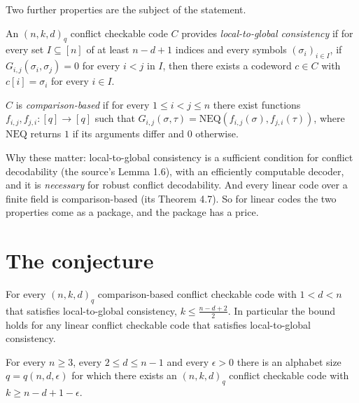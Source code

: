 \documentclass{aicr-conjecture}
\newcommand{\NEQ}{\mathrm{NEQ}}
\begin{document}
Two further properties are the subject of the statement.

\begin{definition}\label{def:l2g}
An $(n,k,d)_{q}$ conflict checkable code $C$ provides \emph{local-to-global
consistency} if for every set $I \subseteq [n]$ of at least $n-d+1$
indices and every symbols $(\sigma_{i})_{i \in I}$, if $G_{i,j}(\sigma_i,
\sigma_j) = 0$ for every $i < j$ in $I$, then there exists a codeword $c
\in C$ with $c[i] = \sigma_{i}$ for every $i \in I$.
\end{definition}

\begin{definition}\label{def:cb}
$C$ is \emph{comparison-based} if for every $1 \le i < j \le n$ there
exist functions $f_{i,j}, f_{j,i} : [q] \to [q]$ such that
$G_{i,j}(\sigma, \tau) = \NEQ(f_{i,j}(\sigma), f_{j,i}(\tau))$, where
$\NEQ$ returns $1$ if its arguments differ and $0$ otherwise.
\end{definition}

Why these matter: local-to-global consistency is a sufficient condition
for conflict decodability (the source's Lemma 1.6), with an efficiently
computable decoder, and it is \emph{necessary} for robust conflict
decodability. And every linear code over a finite field is
comparison-based (its Theorem 4.7). So for linear codes the two
properties come as a package, and the package has a price.

\section{The conjecture}\label{sec:conjectures}

\begin{theorem}\label{thm:bound}
For every $(n,k,d)_{q}$ comparison-based conflict checkable code with
$1 < d < n$ that satisfies local-to-global consistency, $k \le
\frac{n-d+2}{2}$. In particular the bound holds for any linear conflict
checkable code that satisfies local-to-global consistency.
\end{theorem}

\begin{theorem}\label{thm:amds}
For every $n \ge 3$, every $2 \le d \le n-1$ and every $\epsilon > 0$
there is an alphabet size $q = q(n,d,\epsilon)$ for which there exists an
$(n,k,d)_{q}$ conflict checkable code with $k \ge n-d+1-\epsilon$.
\end{theorem}
\end{document}
